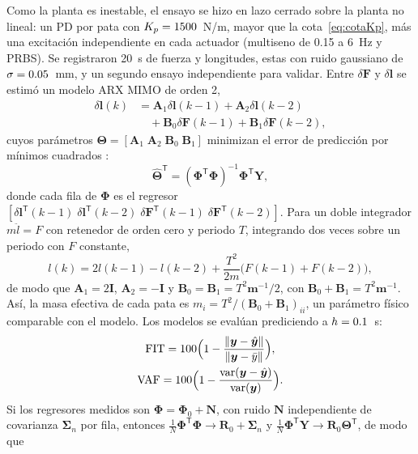 \documentclass[conference]{IEEEtran}
\newcommand{\vect}[1]{\bm{#1}}
\newcommand{\T}{^{\mathsf{T}}}
\begin{document}
Como la planta es inestable, el ensayo se hizo en lazo cerrado sobre la planta no lineal: un PD por pata con $K_p = 1500$~N/m, mayor que la cota~\eqref{eq:cotaKp}, más una excitación independiente en cada actuador (multiseno de 0.15 a 6~Hz y PRBS). Se registraron 20~s de fuerza y longitudes, estas con ruido gaussiano de $\sigma = 0.05$~mm, y un segundo ensayo independiente para validar. Entre $\delta\vect F$ y $\delta\vect l$ se estimó un modelo ARX MIMO de orden 2,
\begin{equation}
\begin{split}
\delta\vect l(k) &= \vect A_1\delta\vect l(k-1) + \vect A_2\delta\vect l(k-2)\\ &\quad + \vect B_0\delta\vect F(k-1) + \vect B_1\delta\vect F(k-2),
\end{split}
\end{equation}
cuyos parámetros $\boldsymbol\Theta = [\vect A_1\;\vect A_2\;\vect B_0\;\vect B_1]$ minimizan el error de predicción por mínimos cuadrados \cite{ljung1999}:
\begin{equation}
\hat{\boldsymbol\Theta}\T = (\boldsymbol\Phi\T\boldsymbol\Phi)^{-1}\boldsymbol\Phi\T\vect Y ,
\end{equation}
donde cada fila de $\boldsymbol\Phi$ es el regresor $[\delta\vect l\T(k-1)\;\delta\vect l\T(k-2)\;\delta\vect F\T(k-1)\;\delta\vect F\T(k-2)]$. Para un doble integrador $m\ddot l = F$ con retenedor de orden cero y periodo $T$, integrando dos veces sobre un periodo con $F$ constante,
\begin{equation}
l(k) = 2l(k-1) - l(k-2) + \frac{T^2}{2m}\bigl(F(k-1) + F(k-2)\bigr),
\end{equation}
de modo que $\vect A_1 = 2\vect I$, $\vect A_2 = -\vect I$ y $\vect B_0 = \vect B_1 = T^2\vect m^{-1}/2$, con $\vect B_0 + \vect B_1 = T^2\vect m^{-1}$. Así, la masa efectiva de cada pata es $m_i = T^2/(\vect B_0 + \vect B_1)_{ii}$, un parámetro físico comparable con el modelo. Los modelos se evalúan prediciendo a $h = 0.1$~s:
\begin{gather}
\mathrm{FIT} = 100\Bigl(1 - \frac{\lVert\vect y - \hat{\vect y}\rVert}{\lVert\vect y - \bar y\rVert}\Bigr),\nonumber\\ \mathrm{VAF} = 100\Bigl(1 - \frac{\mathrm{var}(\vect y - \hat{\vect y})}{\mathrm{var}(\vect y)}\Bigr).
\end{gather}
Si los regresores medidos son $\boldsymbol\Phi = \boldsymbol\Phi_0 + \vect N$, con ruido $\vect N$ independiente de covarianza $\boldsymbol\Sigma_n$ por fila, entonces $\frac1N\boldsymbol\Phi\T\boldsymbol\Phi \to \vect R_0 + \boldsymbol\Sigma_n$ y $\frac1N\boldsymbol\Phi\T\vect Y \to \vect R_0\boldsymbol\Theta\T$, de modo que
\end{document}
